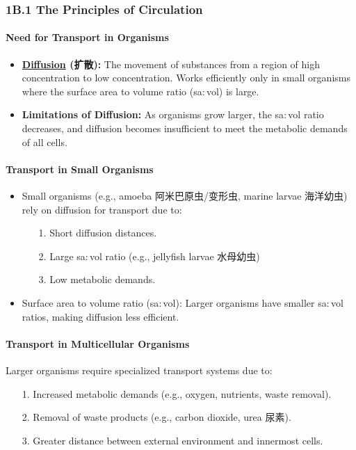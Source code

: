 
\subsubsection{1B.1 The Principles of Circulation}
\paragraph{Need for Transport in Organisms}
\begin{itemize}
    \item \textbf{\underline{Diffusion} (扩散):} The movement of substances from a region of high concentration to low
    concentration. Works efficiently only in small organisms where the surface area to volume ratio (sa$:$vol) is large.
    \item \textbf{Limitations of Diffusion:} As organisms grow larger, the sa$:$vol ratio decreases, and diffusion becomes
    insufficient to meet the metabolic demands of all cells.
\end{itemize}

\paragraph{Transport in Small Organisms}
\begin{itemize}
    \item Small organisms (e.g., amoeba 阿米巴原虫/变形虫, marine larvae 海洋幼虫) rely on diffusion for transport due to:
    \begin{itemize}
        \item[1.] Short diffusion distances.
        \item[2.] Large sa$:$vol ratio (e.g., jellyfish larvae 水母幼虫)
        \item[3.] Low metabolic demands.
    \end{itemize}
    \item Surface area to volume ratio (sa$:$vol): Larger organisms have smaller sa$:$vol ratios, making diffusion less efficient.
\end{itemize}

\paragraph{Transport in Multicellular Organisms}
Larger organisms require specialized transport systems due to:
\begin{itemize}
    \item[1.] Increased metabolic demands (e.g., oxygen, nutrients, waste removal).
    \item[2.] Removal of waste products (e.g., carbon dioxide, urea 尿素).
    \item[3.] Greater distance between external environment and innermost cells.
\end{itemize}

